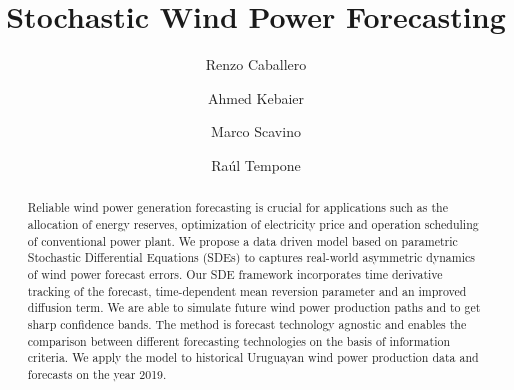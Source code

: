 \documentclass[11pt]{article}
\begin{document}
\title{ Stochastic Wind Power Forecasting }  %

\author[1]{Renzo Caballero}
\author[2]{Ahmed Kebaier}
\author[3]{Marco Scavino}
\author[4]{ Ra\'ul  Tempone}


\maketitle


\begin{abstract}

Reliable wind power generation forecasting is crucial for applications such as the allocation of energy reserves, optimization of electricity price and operation scheduling of conventional power plant. We propose a data driven model based on parametric Stochastic Differential Equations (SDEs) to captures real-world asymmetric dynamics of wind power forecast errors. Our SDE framework incorporates time derivative tracking of the forecast, time-dependent mean reversion parameter and an improved diffusion term. We are able to simulate future wind power production paths and to get sharp confidence bands. The method is forecast technology agnostic and enables the comparison between different forecasting technologies on the basis of information criteria. We apply the model to historical Uruguayan wind power production data and forecasts on the year 2019.

\end{abstract}
\end{document}
